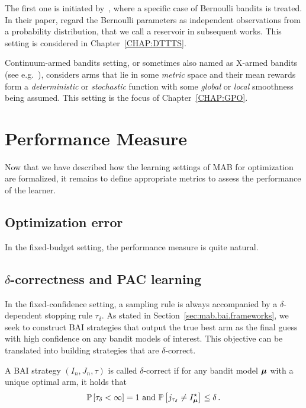 The first one is initiated by~\cite{berry1997infinite}, where a specific case of Bernoulli bandits is treated. In their paper, \cite{berry1997infinite} regard the Bernoulli parameters as independent observations from a probability distribution, that we call a \gls{reservoir} in subsequent works. This setting is considered in Chapter~\ref{CHAP:DTTTS}.

Continuum-armed bandits setting, or sometimes also named as \gls{X-armed bandits} (see e.g.~\citealt{bubeck2010x}), considers arms that lie in some \emph{metric} space and their mean rewards form a \emph{deterministic} or \emph{stochastic} function with some \emph{global} or \emph{local} smoothness being assumed. This setting is the focus of Chapter~\ref{CHAP:GPO}.

\section{Performance Measure}\label{sec:mab.performance}

Now that we have described how the learning settings of MAB for optimization are formalized, it remains to define appropriate metrics to assess the performance of the learner.

\subsection{Optimization error}\label{sec:mab.performance.optim}

In the fixed-budget setting, the performance measure is quite natural.

\subsection{$\delta$-correctness and PAC learning}\label{sec:mab.performance.pac}

In the fixed-confidence setting, a sampling rule is always accompanied by a $\delta$-dependent stopping rule $\tau_{\delta}$. As stated in Section~\ref{sec:mab.bai.frameworks}, we seek to construct BAI strategies that output the true best arm as the final guess with high confidence on any bandit models of interest. This objective can be translated into building strategies that are $\delta$-correct.

\begin{definition}\label{def:mab.delta}
\begin{leftbar}[defnbar]
A BAI strategy $(I_n,J_n,\tau)$ is called $\delta$-correct if for any bandit model ${\boldsymbol \mu}$ with a unique optimal arm, it holds that
\[
	\mathbb{P}\left[\tau_\delta < \infty\right] = 1 \text{ and } \mathbb{P}\left[j_{\tau_\delta}\neq I_{{\boldsymbol \mu}}^{\star}\right] \leq \delta\,.
\]
\end{leftbar}
\end{definition}

